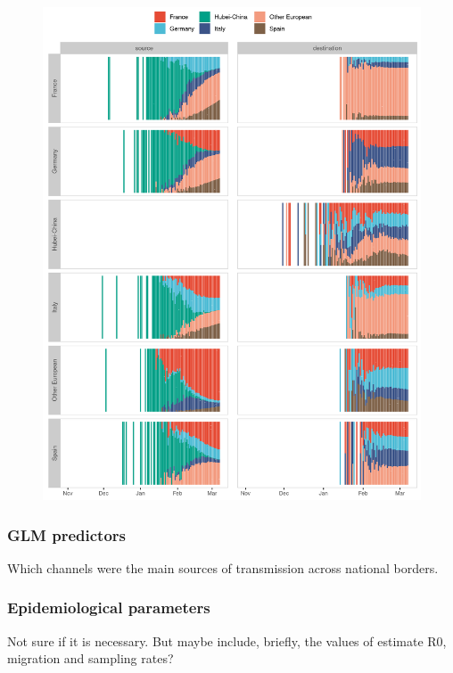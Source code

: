 \documentclass[12pt]{article}
\begin{document}
\begin{figure}[]
    \centering
    \includegraphics[width=\textwidth]{201030_europe3_figtraj08.png}
    \caption{}
    \label{fig:migs_srcdest}
\end{figure}


\subsubsection*{GLM predictors}

Which channels were the main sources of transmission across national borders.

\subsubsection*{Epidemiological parameters}

Not sure if it is necessary. But maybe include, briefly, the values of estimate R0, migration and sampling rates?
\end{document}

